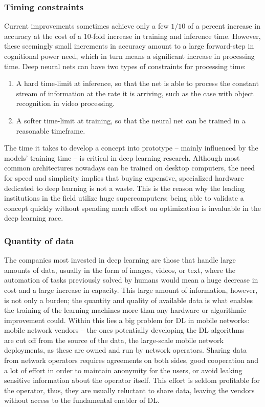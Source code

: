 			\subsubsection*{Timing constraints}
			
				Current improvements sometimes achieve only a few $1/10$ of a percent increase in accuracy at the cost of a $10$-fold increase in training and inference time.
				However, these seemingly small increments in accuracy amount to a large forward-step in cognitional power need, which in turn means a significant increase in processing time.
				Deep neural nets can have two types of constraints for processing time:
				\begin{enumerate}[label=\textbf{\alph*})]
					\item A hard time-limit at inference, so that the net is able to process the constant stream of information at the rate it is arriving, such as the case with object recognition in video processing.
					\item A softer time-limit at training, so that the neural net can be trained in a reasonable timeframe.
				\end{enumerate}	
				\noindent The time it takes to develop a concept into prototype -- mainly influenced by the models’ training time -- is critical in deep learning research.
				Although most common architectures nowadays can be trained on desktop computers, the need for speed and simplicity implies that buying expensive, specialized hardware dedicated to deep learning is not a waste.
				This is the reason why the leading institutions in the field utilize huge supercomputers; being able to validate a concept quickly without spending much effort on optimization is invaluable in the deep learning race.
			
			\subsubsection*{Quantity of data}
			
				The companies most invested in deep learning are those that handle large amounts of data, usually in the form of images, videos, or text, where the automation of tasks previously solved by humans would mean a huge decrease in cost and a large increase in capacity.
				This large amount of information, however, is not only a burden; the quantity and quality of available data is what enables the training of the learning machines more than any hardware or algorithmic improvement could.
				Within this lies a big problem for \ac{DL} in mobile networks: mobile network vendors -- the ones potentially developing the \ac{DL} algorithms -- are cut off from the source of the data, the large-scale mobile network deployments, as these are owned and run by network operators.
				Sharing data from network operators requires agreements on both sides, good cooperation and a lot of effort in order to maintain anonymity for the users, or avoid leaking sensitive information about the operator itself.
				This effort is seldom profitable for the operator, thus, they are usually reluctant to share data, leaving the vendors without access to the fundamental enabler of \ac{DL}.
					
